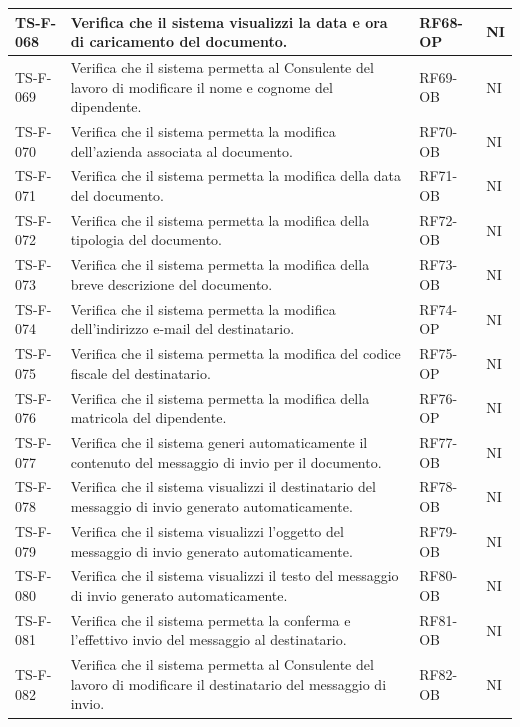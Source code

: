 \documentclass[a4paper,12pt]{article}
\begin{document}
\begin{longtable}{|p{2.2cm}|p{9.5cm}|p{2.3cm}|p{1.5cm}|}
    \hline
    TS-F-068 & Verifica che il sistema visualizzi la data e ora di caricamento del documento. & RF68-OP & NI \\
    \hline
    TS-F-069 & Verifica che il sistema permetta al Consulente del lavoro di modificare il nome e cognome del dipendente. & RF69-OB & NI \\
    \hline
    TS-F-070 & Verifica che il sistema permetta la modifica dell'azienda associata al documento. & RF70-OB & NI \\
    \hline
    TS-F-071 & Verifica che il sistema permetta la modifica della data del documento. & RF71-OB & NI \\
    \hline
    TS-F-072 & Verifica che il sistema permetta la modifica della tipologia del documento. & RF72-OB & NI \\
    \hline
    TS-F-073 & Verifica che il sistema permetta la modifica della breve descrizione del documento. & RF73-OB & NI \\
    \hline
    TS-F-074 & Verifica che il sistema permetta la modifica dell'indirizzo e-mail del destinatario. & RF74-OP & NI \\
    \hline
    TS-F-075 & Verifica che il sistema permetta la modifica del codice fiscale del destinatario. & RF75-OP & NI \\
    \hline
    TS-F-076 & Verifica che il sistema permetta la modifica della matricola del dipendente. & RF76-OP & NI \\
    \hline
    TS-F-077 & Verifica che il sistema generi automaticamente il contenuto del messaggio di invio per il documento. & RF77-OB & NI \\
    \hline
    TS-F-078 & Verifica che il sistema visualizzi il destinatario del messaggio di invio generato automaticamente. & RF78-OB & NI \\
    \hline
    TS-F-079 & Verifica che il sistema visualizzi l'oggetto del messaggio di invio generato automaticamente. & RF79-OB & NI \\
    \hline
    TS-F-080 & Verifica che il sistema visualizzi il testo del messaggio di invio generato automaticamente. & RF80-OB & NI \\
    \hline
    TS-F-081 & Verifica che il sistema permetta la conferma e l'effettivo invio del messaggio al destinatario. & RF81-OB & NI \\
    \hline
    TS-F-082 & Verifica che il sistema permetta al Consulente del lavoro di modificare il destinatario del messaggio di invio. & RF82-OB & NI \\
    \hline

\end{longtable}
\end{document}
